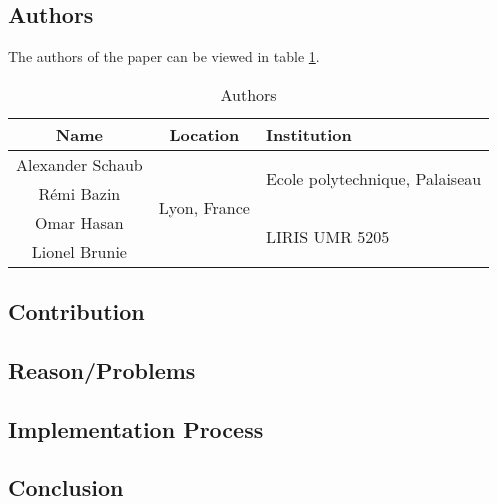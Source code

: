 \clearpage
\section*{\citet{2016_Schaub}}

\subsection*{Authors}
The authors of the paper can be viewed in table \ref{tab:2016_Schaub_Authors}.
\begin{longtable}{ |c|c|p{5cm}| }
	\caption{Authors} \label{tab:2016_Schaub_Authors} \\
	\hline
 	\cellcolor{Gray}Name & \cellcolor{Gray}Location & \cellcolor{Gray}Institution \\ [0.5ex] 
 	\hline\hline
 	\endhead
 	Alexander Schaub & \multirow{4}{*}{\parbox{5cm}{\centering Lyon, France}}  & \multirow{2}{*}{\parbox{5cm}{\centering Ecole polytechnique, Palaiseau}}  \\
	\cline{1-1}
	 Rémi Bazin &   & \\
	 \cline{1-1}
	 \cline{3-3}
	 Omar Hasan & & \multirow{2}{*}{\parbox{5cm}{\centering LIRIS UMR 5205}} \\
	 \cline{1-1}
	 Lionel Brunie & & \\
	 \hline
\end{longtable}


\subsection*{Contribution}



\subsection*{Reason/Problems}



\subsection*{Implementation Process}


\subsection*{Conclusion}

